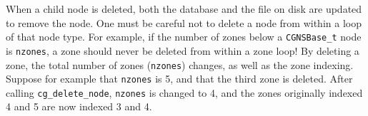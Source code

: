 When a child node is deleted, both the database and the file on disk are
updated to remove the node.
One must be careful not to delete a node from within a loop of that node
type.
For example, if the number of zones below a \texttt{CGNSBase\_t} node is
\texttt{nzones}, a zone should never be deleted from within a zone loop!
By deleting a zone, the total number of zones (\texttt{nzones}) changes,
as well as the zone indexing.
Suppose for example that \texttt{nzones} is 5, and that the third zone
is deleted.
After calling \texttt{cg\_delete\_node}, \texttt{nzones} is changed to 4,
and the zones originally indexed 4 and 5 are now indexed 3 and 4.
